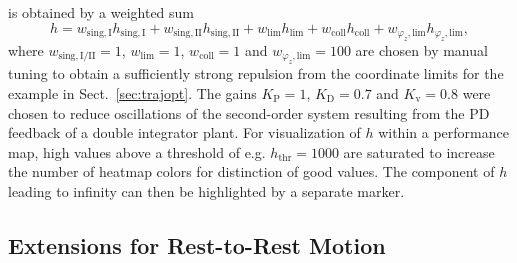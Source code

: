 \documentclass[runningheads]{llncs}
\begin{document}
is obtained by a weighted sum 
%
\begin{equation}
h = 
w_{\mathrm{sing,I}} h_{\mathrm{sing,I}}
+ w_{\mathrm{sing,II}} h_{\mathrm{sing,II}}
+ w_{\mathrm{lim}} h_{\mathrm{lim}}
+ w_{\mathrm{coll}} h_{\mathrm{coll}}
+ w_{\varphi_{z},\mathrm{lim}} h_{\varphi_{z},\mathrm{lim}},
\label{equ:h_sum}
\end{equation}
%
where $w_{\mathrm{sing,I/II}}{=}1$, $w_{\mathrm{lim}}{=}1$, $w_{\mathrm{coll}}{=}1$ and $w_{\varphi_{z},\mathrm{lim}}{=}100$ are chosen by manual tuning to obtain a sufficiently strong repulsion from the coordinate limits for the example in Sect.~\ref{sec:trajopt}.
The gains $K_\mathrm{P}{=}1$, $K_\mathrm{D}{=}0.7$ and $K_\mathrm{v}{=}0.8$ were chosen to reduce oscillations of the second-order system resulting from the PD feedback of a double integrator plant.
For visualization of $h$ within a performance map, high values above a threshold of e.g. $h_{\mathrm{thr}}=1000$ are saturated to increase the number of heatmap colors for distinction of good values.
The component of $h$ leading to infinity can then be highlighted by a separate marker.

\subsection{Extensions for Rest-to-Rest Motion}
\end{document}
